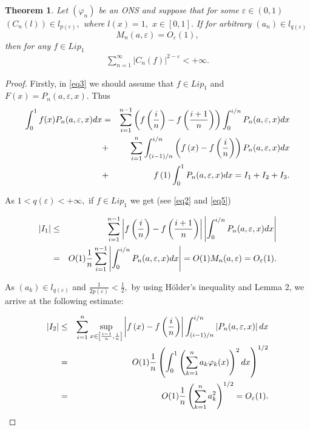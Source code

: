 \documentclass{publmathdeb}
\newtheorem{theorem}{Theorem}[section]
\begin{document}
	\begin{theorem}
		\label{theorem1} Let $(\varphi_n)$ be an ONS and suppose that for some $\varepsilon \in (0,1)$  $(C_n (l)) \in l_{p(\varepsilon)},$ where $l(x)=1,$ $x \in [0,1].$ If for arbitrary $(a_n) \in l_{q(\varepsilon)}$ 
		\begin{equation}
			\label{eq5}
			M_n(a, \varepsilon) = O_{\varepsilon}(1),
		\end{equation}
		then for any $f\in Lip_1$
		\begin{eqnarray*}
			\sum_{n=1}^{\infty} \left|C_n(f)\right|^{2-\varepsilon} <+ \infty.
		\end{eqnarray*}
		
	\end{theorem}
	
	
	\begin{proof}
		Firstly, in \eqref{eq3} we should assume that $f \in Lip_1$ and $F(x)= P_n( a, \varepsilon,x).$ Thus
		\begin{eqnarray}
			\label{eq6}
			\int_{0}^{1} f(x) P_n(a, \varepsilon, x) dx &=& \sum_{i=1}^{n-1}\left(f\left(\frac{i}{n}\right)-f\left(\frac{i+1}{n}\right)\right)\int_{0}^{i/n}P_n(a, \varepsilon, x)dx \notag  \\
			&+& \sum_{i=1}^{n}\int_{\left(i-1\right)/n}^{i/n}\left(f\left(x\right) -f\left(\frac{i}{n}\right)\right)P_n(a, \varepsilon, x) dx     \notag \\
			&+& f\left(1\right)\int_{0}^{1}P_n(a, \varepsilon, x)dx=I_1 +I_2  +I_3.   
		\end{eqnarray}
		
		As $1<q(\varepsilon)<+\infty,$ if $f \in Lip_1$ we get (see \eqref{eq2} and \eqref{eq5})
		
		\begin{eqnarray}
			\label{eq8} \left|I_1\right| &\leq& \sum_{i=1}^{n-1}\left|f\left(\frac{i}{n}\right) -f\left(\frac{i+1}{n}\right)\right|\left|\int_{0}^{i/n}P_n(a, \varepsilon, x)dx \right| \\
			&=& O(1) \frac{1}{n} \sum_{i=1}^{n-1}\left|\int_{0}^{i/n}P_n(a, \varepsilon, x)dx\right| = O(1)M_n(a, \varepsilon) = O_{\varepsilon}(1). \notag
		\end{eqnarray}
		
		As $(a_k)\in l_{q(\varepsilon)}$ and $\frac{1}{2p(\varepsilon)}< \frac{1}{2},$ by using Hölder's inequality and Lemma 2, we arrive at the following estimate:
		
		\begin{eqnarray}
			\label{eq9}  \left|I_2\right| &\leq&  \sum_{i=1}^{n} \sup_{x\in \left[\frac{i-1}{n}, \frac{i}{n}\right]}\left|f\left(x\right) -f\left(\frac{i}{n}\right)\right| \int_{\left(i-1\right)/n}^{i/n} \left|P_n(a, \varepsilon, x) \right| dx \\
			&=& O(1)\frac{1}{n} \left(\int_{0}^{1} \left(\sum_{k=1}^{n} a_k \varphi_{k}(x) \right)^2 dx \right)^{1/2}   \notag \\
			&=& O(1) \frac{1}{n} \left( \sum_{k=1}^{n} a_k^2\right)^{1/2}   = O_{\varepsilon} (1).    \notag
		\end{eqnarray}
		

\end{proof}
\end{document}
